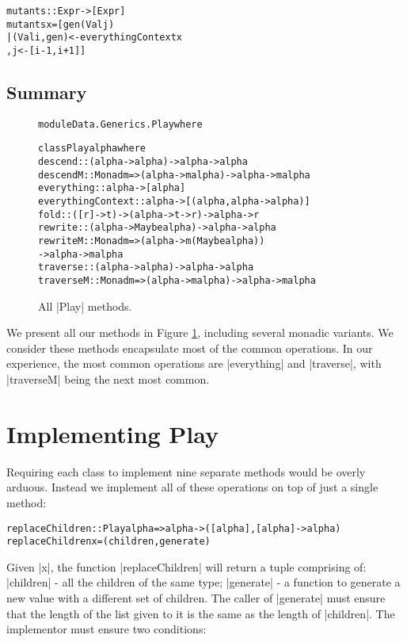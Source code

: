 \documentclass[preprint]{sigplanconf}
\newenvironment{code}{\begin{alltt}\small}{\end{alltt}}
\begin{document}
\begin{code}
mutants :: Expr -> [Expr]
mutants x =  [gen (Val j)
             | (Val i, gen) <- everythingContext x
             , j <- [i-1, i+1]]
\end{code}


\subsection{Summary}

\begin{figure}
\begin{code}
module Data.Generics.Play where

class Play alpha where
    descend            :: (alpha -> alpha) -> alpha -> alpha
    descendM           :: Monad m => (alpha -> m alpha) -> alpha -> m alpha
    everything         :: alpha -> [alpha]
    everythingContext  :: alpha -> [(alpha, alpha -> alpha)]
    fold               :: ([r] -> t) -> (alpha -> t -> r) -> alpha -> r
    rewrite            :: (alpha -> Maybe alpha) -> alpha -> alpha
    rewriteM           :: Monad m  => (alpha -> m (Maybe alpha))
                                   -> alpha -> m alpha
    traverse           :: (alpha -> alpha) -> alpha -> alpha
    traverseM          :: Monad m => (alpha -> m alpha) -> alpha -> m alpha
\end{code}
\caption{All |Play| methods.}
\label{fig:play}
\end{figure}

We present all our methods in Figure \ref{fig:play}, including several monadic variants. We consider these methods encapsulate most of the common operations. In our experience, the most common operations are |everything| and |traverse|, with |traverseM| being the next most common.


\section{Implementing Play}

Requiring each class to implement nine separate methods would be overly arduous. Instead we implement all of these operations on top of just a single method:

\begin{code}
replaceChildren :: Play alpha => alpha -> ([alpha], [alpha] -> alpha)
replaceChildren x = (children,generate)
\end{code}

Given |x|, the function |replaceChildren| will return a tuple comprising of: |children| - all the children of the same type; |generate| - a function to generate a new value with a different set of children. The caller of |generate| must ensure that the length of the list given to it is the same as the length of |children|. The implementor must ensure two conditions:
\end{document}
